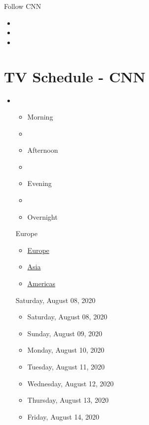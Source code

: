 Follow CNN

\begin{itemize}
\item
\item
\item
\end{itemize}

\hypertarget{tv-schedule---cnn}{%
\section{TV Schedule - CNN}\label{tv-schedule---cnn}}

\begin{itemize}
\item
  \begin{itemize}
  \tightlist
  \item
    Morning
  \item
    \textbar{}
  \item
    Afternoon
  \item
    \textbar{}
  \item
    Evening
  \item
    \textbar{}
  \item
    Overnight
  \end{itemize}

  Europe

  \begin{itemize}
  \tightlist
  \item
    \href{/tv/schedule/europe/index.html}{Europe}
  \item
    \href{/tv/schedule/asia/index.html}{Asia}
  \item
    \href{/tv/schedule/americas/index.html}{Americas}
  \end{itemize}

  Saturday, August 08, 2020

  \begin{itemize}
  \tightlist
  \item
    Saturday, August 08, 2020
  \item
    Sunday, August 09, 2020
  \item
    Monday, August 10, 2020
  \item
    Tuesday, August 11, 2020
  \item
    Wednesday, August 12, 2020
  \item
    Thursday, August 13, 2020
  \item
    Friday, August 14, 2020
  \end{itemize}
\end{itemize}


